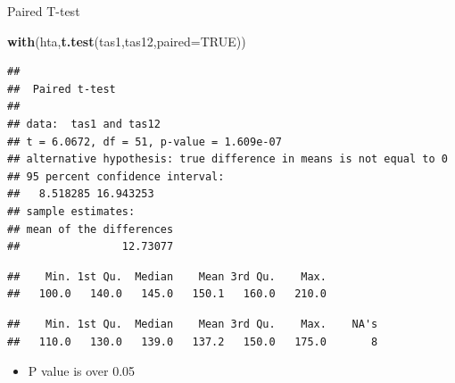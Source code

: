 \documentclass[
  ignorenonframetext,
]{beamer}
\newenvironment{Shaded}{\begin{snugshade}}{\end{snugshade}}
\newcommand{\DataTypeTok}[1]{\textcolor[rgb]{0.13,0.29,0.53}{#1}}
\newcommand{\KeywordTok}[1]{\textcolor[rgb]{0.13,0.29,0.53}{\textbf{#1}}}
\newcommand{\NormalTok}[1]{#1}
\newcommand{\OperatorTok}[1]{\textcolor[rgb]{0.81,0.36,0.00}{\textbf{#1}}}
\newcommand{\OtherTok}[1]{\textcolor[rgb]{0.56,0.35,0.01}{#1}}
\providecommand{\tightlist}{%
  \setlength{\itemsep}{0pt}\setlength{\parskip}{0pt}}
\begin{document}
\begin{frame}[fragile]{Paired T-test}
\protect\hypertarget{paired-t-test}{}

\small

\begin{Shaded}
\begin{Highlighting}[]
\KeywordTok{with}\NormalTok{(hta,}\KeywordTok{t.test}\NormalTok{(tas1,tas12,}\DataTypeTok{paired=}\OtherTok{TRUE}\NormalTok{))}
\end{Highlighting}
\end{Shaded}

\begin{verbatim}
## 
##  Paired t-test
## 
## data:  tas1 and tas12
## t = 6.0672, df = 51, p-value = 1.609e-07
## alternative hypothesis: true difference in means is not equal to 0
## 95 percent confidence interval:
##   8.518285 16.943253
## sample estimates:
## mean of the differences 
##                12.73077
\end{verbatim}

\begin{Shaded}
\end{Shaded}

\begin{verbatim}
##    Min. 1st Qu.  Median    Mean 3rd Qu.    Max. 
##   100.0   140.0   145.0   150.1   160.0   210.0
\end{verbatim}

\begin{Shaded}
\end{Shaded}

\begin{verbatim}
##    Min. 1st Qu.  Median    Mean 3rd Qu.    Max.    NA's 
##   110.0   130.0   139.0   137.2   150.0   175.0       8
\end{verbatim}

\begin{itemize}
\tightlist
\item
  P value is over 0.05
\end{itemize}

\end{frame}
\end{document}
